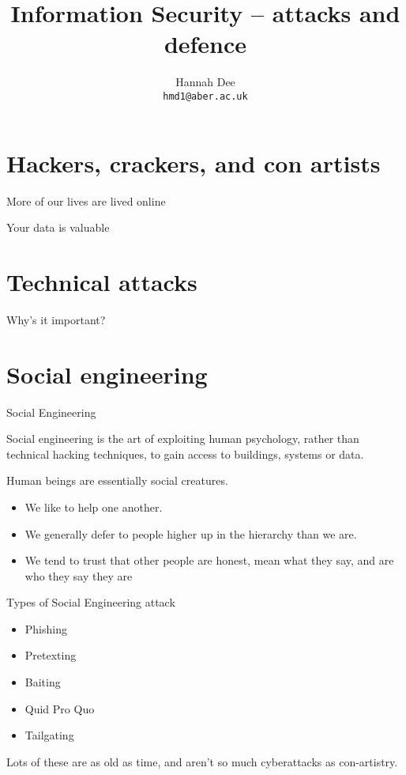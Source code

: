 \documentclass[xcolor=table]{beamer}
\title{Information Security -- attacks and defence}
\author[hmd1]{Hannah Dee \\
  \texttt{hmd1@aber.ac.uk}}
\date{}
\institute[]{U3A Aberystwyth, April 2023\\
  Aberystwyth University, Department of Computer Science}
\begin{document}
\begin{frame}
  \titlepage
\end{frame}


\section{Hackers, crackers, and con artists}

\begin{frame}{More of our lives are lived online}
\end{frame}

\begin{frame}{Your data is valuable}
\end{frame}

\section{Technical attacks}

\begin{frame}{Why's it important?}

\end{frame}

\section{Social engineering }

\begin{frame}{Social Engineering}

Social engineering is the art of exploiting human psychology,
rather than technical hacking techniques, to gain access to
buildings, systems or data.

Human beings are essentially social creatures.

	\begin{itemize}
		\item We like to help one another.
		\item We generally defer to people higher up in the hierarchy than we are.  
		\item We tend to trust that other people are honest, mean what they say, and are who they say they are
	\end{itemize}
\end{frame}

\begin{frame}{Types of Social Engineering attack}
	\begin{itemize}
		\item Phishing
		\item Pretexting
		\item Baiting
		\item Quid Pro Quo
		\item Tailgating
	\end{itemize}
	Lots of these are as old as time, and aren't so much cyberattacks as con-artistry.
\end{frame}
\end{document}
